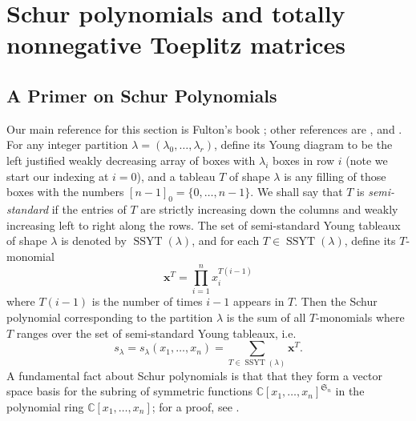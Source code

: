 \documentclass[unnumsec,webpdf,modern,medium]{oup-authoring-template}
\newcommand{\C}{\mathbb{C}}
\theoremstyle{theorem}
\theoremstyle{definition}
\begin{document}
\section{Schur polynomials and totally nonnegative Toeplitz matrices}
\label{sec:Schur}
\subsection{A Primer on Schur Polynomials}
Our main reference for this section is Fulton's book \cite{F}; other references are \cite{LT}, \cite{Smith} and \cite{Stanley}.
For any integer partition $\lambda=(\lambda_0,\ldots,\lambda_r)$, define its Young diagram to be the left justified weakly decreasing array of boxes with $\lambda_i$ boxes in row $i$ (note we start our indexing at $i=0$), and a tableau $T$ of shape $\lambda$ is any filling of those boxes with the numbers $[n-1]_0=\{0,\ldots,n-1\}$.  We shall say that $T$ is \emph{semi-standard} if the entries of $T$ are strictly increasing down the columns and weakly increasing left to right along the rows.  The set of semi-standard Young tableaux of shape $\lambda$ is denoted by $\operatorname{SSYT}(\lambda)$, and for each $T\in\operatorname{SSYT}(\lambda)$, define its $T$-monomial 
$$\mathbf{x}^T=\prod_{i=1}^nx_i^{T(i-1)}$$
where $T(i-1)$ is the number of times $i-1$ appears in $T$.  Then the Schur polynomial corresponding to the partition $\lambda$ is the sum of all $T$-monomials where $T$ ranges over the set of semi-standard Young tableaux, i.e. 
$$s_\lambda=s_\lambda(x_1,\ldots,x_n)=\sum_{T\in\operatorname{SSYT}(\lambda)}\mathbf{x}^T.$$
A fundamental fact about Schur polynomials is that that they form a vector space basis for the subring of symmetric functions $\C[x_1,\ldots,x_n]^{\mathfrak{S}_n}$ in the polynomial ring $\C[x_1,\ldots,x_n]$; for a proof, see \cite[Proposition 6.1]{F}.
\end{document}

